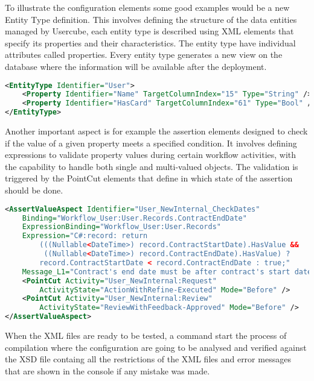 To illustrate the configuration elements some good examples would be a new Entity Type definition. This involves defining the structure of the data entities managed by Usercube, each entity type is described using XML elements that specify its properties and their characteristics. The entity type have individual attributes called properties. Every entity type generates a new view on the database where the information will be available after the deployment.


\begin{lstlisting}[language=XML, caption=Definition of the User Entity Type example]
<EntityType Identifier="User">
    <Property Identifier="Name" TargetColumnIndex="15" Type="String" />
    <Property Identifier="HasCard" TargetColumnIndex="61" Type="Bool" />
</EntityType>
\end{lstlisting}

Another important aspect is for example the assertion elements designed to check if the value of a given property meets a specified condition. It involves defining expressions to validate property values during certain workflow activities, with the capability to handle both single and multi-valued objects. The validation is triggered by the PointCut elements that define in which state of the assertion should be done.

\begin{lstlisting}[language=XML, caption=AssertValueAspect element example to check a date]
<AssertValueAspect Identifier="User_NewInternal_CheckDates" 
    Binding="Workflow_User:User.Records.ContractEndDate" 
    ExpressionBinding="Workflow_User:User.Records"
    Expression="C#:record: return 
        (((Nullable<DateTime>) record.ContractStartDate).HasValue &&
         ((Nullable<DateTime>) record.ContractEndDate).HasValue) ?
        record.ContractStartDate < record.ContractEndDate : true;"
    Message_L1="Contract's end date must be after contract's start date.">
    <PointCut Activity="User_NewInternal:Request"
        ActivityState="ActionWithRefine-Executed" Mode="Before" />
    <PointCut Activity="User_NewInternal:Review"
        ActivityState="ReviewWithFeedback-Approved" Mode="Before" />
</AssertValueAspect>
\end{lstlisting}

When the XML files are ready to be tested, a command start the process of compilation where the configuration are going to be analysed and verified against the XSD file containg all the restrictions of the XML files and error messages that are shown in the console if any mistake was made.

